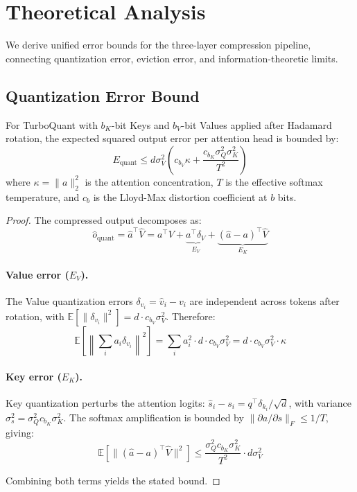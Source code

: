 \section{Theoretical Analysis}
\label{sec:theory}

We derive unified error bounds for the three-layer compression pipeline, connecting quantization error, eviction error, and information-theoretic limits.

\subsection{Quantization Error Bound}

\begin{theorem}
\label{thm:quant}
For TurboQuant with $b_K$-bit Keys and $b_V$-bit Values applied after Hadamard rotation, the expected squared output error per attention head is bounded by:
\begin{equation}
    E_{\text{quant}} \leq d\sigma_V^2 \left( c_{b_V} \kappa + \frac{c_{b_K} \sigma_Q^2 \sigma_K^2}{T^2} \right)
\end{equation}
where $\kappa = \|a\|_2^2$ is the attention concentration, $T$ is the effective softmax temperature, and $c_b$ is the Lloyd-Max distortion coefficient at $b$ bits.
\end{theorem}

\begin{proof}
The compressed output decomposes as:
\begin{equation}
    \hat{o}_{\text{quant}} = \hat{a}^\top \hat{V} = a^\top V + \underbrace{a^\top \delta_V}_{E_V} + \underbrace{(\hat{a} - a)^\top \hat{V}}_{E_K}
\end{equation}

\paragraph{Value error ($E_V$).}
The Value quantization errors $\delta_{v_i} = \hat{v}_i - v_i$ are independent across tokens after rotation, with $\mathbb{E}[\|\delta_{v_i}\|^2] = d \cdot c_{b_V} \sigma_V^2$. Therefore:
\begin{equation}
    \mathbb{E}\left[\left\|\sum_i a_i \delta_{v_i}\right\|^2\right] = \sum_i a_i^2 \cdot d \cdot c_{b_V} \sigma_V^2 = d \cdot c_{b_V} \sigma_V^2 \cdot \kappa
\end{equation}

\paragraph{Key error ($E_K$).}
Key quantization perturbs the attention logits: $\hat{s}_i - s_i = q^\top \delta_{k_i} / \sqrt{d}$, with variance $\sigma_s^2 = \sigma_Q^2 c_{b_K} \sigma_K^2$. The softmax amplification is bounded by $\|\partial a / \partial s\|_F \leq 1/T$, giving:
\begin{equation}
    \mathbb{E}\left[\|(\hat{a} - a)^\top \hat{V}\|^2\right] \leq \frac{\sigma_Q^2 c_{b_K} \sigma_K^2}{T^2} \cdot d\sigma_V^2
\end{equation}

Combining both terms yields the stated bound.
\end{proof}

